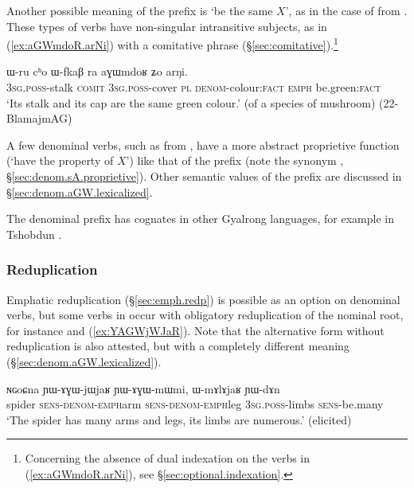  \newpage
Another possible meaning of the  prefix is `be the same $X$', as in the case of  from . These types of verbs have non-singular intransitive subjects, as in (\ref{ex:aGWmdoR.arNi}) with a comitative phrase (§\ref{sec:comitative}).\footnote{Concerning the absence of dual indexation on the verbs in (\ref{ex:aGWmdoR.arNi}), see §\ref{sec:optional.indexation}. }

\begin{exe}
\ex \label{ex:aGWmdoR.arNi}
\gll ɯ-ru cʰo ɯ-fkaβ ra aɣɯmdoʁ ʑo arŋi. \\
\textsc{3sg}.\textsc{poss}-stalk \textsc{comit} \textsc{3sg}.\textsc{poss}-cover \textsc{pl} \textsc{denom}-colour:\textsc{fact} \textsc{emph} be.green:\textsc{fact} \\
\glt `Its stalk and its cap are the same green colour.' (of a species of mushroom) (22-BlamajmAG)
 \end{exe}

A few  denominal verbs, such as 	from , have a more abstract proprietive function (`have the property of $X$') like that of the  prefix (note the synonym , §\ref{sec:denom.sA.proprietive}). Other semantic values of the  prefix are  discussed in §\ref{sec:denom.aGW.lexicalized}.

The  denominal prefix has cognates in other Gyalrong languages, for example  in Tshobdun \citep{jackson14morpho}.

\subsubsection{Reduplication} \label{sec:denom.aGW.redp}
Emphatic reduplication (§\ref{sec:emph.redp}) is  possible as an option on denominal verbs, but some verbs in  occur with obligatory reduplication of the nominal root, for instance  and  (\ref{ex:YAGWjWJaR}). Note that the alternative form  without reduplication is also attested, but with a completely different meaning (§\ref{sec:denom.aGW.lexicalized}).

\begin{exe}
\ex \label{ex:YAGWjWJaR}
\gll ɴɢoɕna ɲɯ-ɤɣɯ-jɯ\redp{}jaʁ ɲɯ-ɤɣɯ-mɯ\redp{}mi, ɯ-mɤlɤjaʁ ɲɯ-dɤn \\
spider \textsc{sens}-\textsc{denom}-\textsc{emph}\redp{}arm  \textsc{sens}-\textsc{denom}-\textsc{emph}\redp{}leg \textsc{3sg}.\textsc{poss}-limbs \textsc{sens}-be.many \\
\glt  `The spider has many arms and legs, its limbs are numerous.' (elicited)
 \end{exe}


